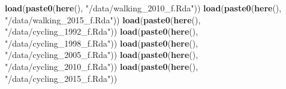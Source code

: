 \documentclass[
11pt, %
oneside, %
english, %
singlespacing, %
]{macthesis} %
\newenvironment{Shaded}{\begin{snugshade}}{\end{snugshade}}
\newcommand{\FunctionTok}[1]{\textcolor[rgb]{0.13,0.29,0.53}{\textbf{#1}}}
\newcommand{\NormalTok}[1]{#1}
\newcommand{\StringTok}[1]{\textcolor[rgb]{0.31,0.60,0.02}{#1}}
\begin{document}
\begin{Shaded}
\begin{Highlighting}[]
\FunctionTok{load}\NormalTok{(}\FunctionTok{paste0}\NormalTok{(}\FunctionTok{here}\NormalTok{(), }\StringTok{"/data/walking\_2010\_f.Rda"}\NormalTok{))}
\FunctionTok{load}\NormalTok{(}\FunctionTok{paste0}\NormalTok{(}\FunctionTok{here}\NormalTok{(), }\StringTok{"/data/walking\_2015\_f.Rda"}\NormalTok{))}
\FunctionTok{load}\NormalTok{(}\FunctionTok{paste0}\NormalTok{(}\FunctionTok{here}\NormalTok{(), }\StringTok{"/data/cycling\_1992\_f.Rda"}\NormalTok{))}
\FunctionTok{load}\NormalTok{(}\FunctionTok{paste0}\NormalTok{(}\FunctionTok{here}\NormalTok{(), }\StringTok{"/data/cycling\_1998\_f.Rda"}\NormalTok{))}
\FunctionTok{load}\NormalTok{(}\FunctionTok{paste0}\NormalTok{(}\FunctionTok{here}\NormalTok{(), }\StringTok{"/data/cycling\_2005\_f.Rda"}\NormalTok{))}
\FunctionTok{load}\NormalTok{(}\FunctionTok{paste0}\NormalTok{(}\FunctionTok{here}\NormalTok{(), }\StringTok{"/data/cycling\_2010\_f.Rda"}\NormalTok{))}
\FunctionTok{load}\NormalTok{(}\FunctionTok{paste0}\NormalTok{(}\FunctionTok{here}\NormalTok{(), }\StringTok{"/data/cycling\_2015\_f.Rda"}\NormalTok{))}
\end{Highlighting}
\end{Shaded}

\begingroup\fontsize{12}{14}\selectfont
\end{document}
